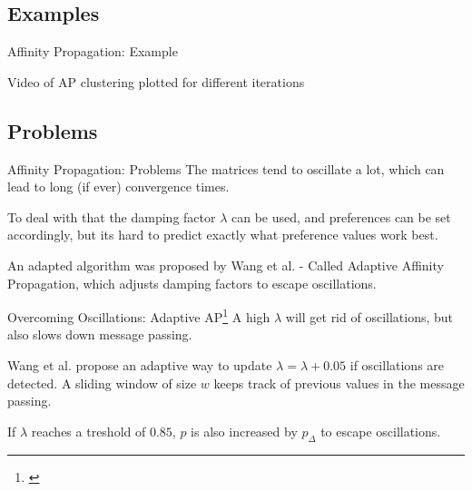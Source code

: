 \documentclass{beamer}
\begin{document}
\subsection{Examples}
\begin{frame}{Affinity Propagation: Example}
	\begin{center}
		Video of AP clustering plotted for different iterations
	\end{center}
\end{frame}

\subsection{Problems}
\begin{frame}{Affinity Propagation: Problems}
	The matrices tend to oscillate a lot, which can lead to long (if ever) convergence times. \cite{frey2007clustering} 
	
	To deal with that the damping factor $\lambda$ can be used, and preferences can be set accordingly, but its hard to predict exactly what preference values work best. \cite{wang2008adaptive}
	
	An adapted algorithm was proposed by Wang et al. - Called Adaptive Affinity Propagation, which adjusts damping factors to escape oscillations. \cite{wang2008adaptive}
\end{frame}
\begin{frame}{Overcoming Oscillations: Adaptive AP\footnote{\cite{wang2008adaptive}}}
	A high $\lambda$ will get rid of oscillations, but also slows down message passing.
	
	Wang et al. propose an adaptive way to update $\lambda = \lambda+0.05$ if oscillations are detected. A sliding window of size $w$ keeps track of previous values in the message passing.
	
	If $\lambda$ reaches a treshold of $0.85$, $p$ is also increased by $p_\Delta$ to escape oscillations.
\end{frame}
\end{document}
